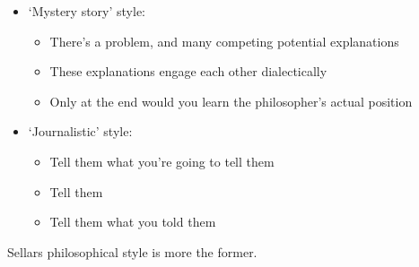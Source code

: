\begin{itemize}
\item `Mystery story' style:
    \begin{itemize}
        \item There's a problem, and many competing potential explanations
        \item These explanations engage each other dialectically
        \item Only at the end would you learn the philosopher's actual position
    \end{itemize}
\item `Journalistic' style:
    \begin{itemize}
        \item Tell them what you're going to tell them
        \item Tell them
        \item Tell them what you told them
    \end{itemize}
\end{itemize}

Sellars philosophical style is more the former.